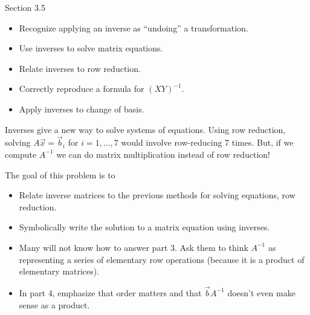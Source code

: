 \begin{lesson}

	Section 3.5

	\begin{itemize}
		\item Recognize applying an inverse as ``undoing'' a transformation.
		\item Use inverses to solve matrix equations.
		\item Relate inverses to row reduction.
		\item Correctly reproduce a formula for $(XY)^{-1}$.
		\item Apply inverses to change of basis.
	\end{itemize}

	Inverses give a new way to solve systems of equations. Using row reduction, solving $A\vec x=\vec b_i$ for $i=1,\ldots, 7$
	would involve row-reducing 7 times. But, if we compute $A^{-1}$ we can do matrix multiplication instead of row reduction!


\end{lesson}
	\bookonlynewpage
	\question
	\begin{annotation}
		\begin{goals}

			The goal of this problem is to
			\begin{itemize}
				\item Relate inverse matrices to the previous methods for solving
					equations, row reduction.
				\item Symbolically write the solution to a matrix equation using inverses.
			\end{itemize}
		\end{goals}

		\begin{notes}
			\begin{itemize}
				\item Many will not know how to answer part 3. Ask them
					to think $A^{-1}$ as representing a series of elementary row
					operations (because it is a product of elementary matrices).
				\item In part 4, emphasize that order matters and that $\vec bA^{-1}$ doesn't
					even make sense as a product.
			\end{itemize}
		\end{notes}
	\end{annotation}
